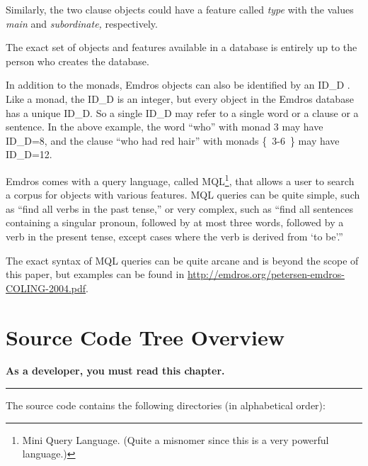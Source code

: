 \documentclass[11pt,oneside,a4paper]{memoir}
\newcommand*{\indexw}[1]{%
  #1%
  \index{#1}%
}
\begin{document}
Similarly, the two clause objects could have a feature called \emph{type} with the values
\emph{main} and \emph{subordinate,} respectively.

The exact set of objects and features available in a database is entirely up to the person who
creates the database.

In addition to the monads, Emdros objects can also be identified by an \indexw{ID\_D}. Like a monad, the ID\_D
is an integer, but every object in the Emdros database has a unique ID\_D. So a single ID\_D may refer to
a single word or a clause or a sentence. In the above example, the word ``who'' with monad 3 may
have ID\_D=8, and the clause ``who had red hair'' with monads \{~3-6~\} may have ID\_D=12.

Emdros comes with a query language, called MQL\footnote{Mini Query Language. (Quite a misnomer since
  this is a very powerful language.)}, that allows a user to search a corpus for objects with
various features. MQL queries can be quite simple, such as ``find all verbs in the past tense,'' or
very complex, such as ``find all sentences containing a singular pronoun, followed by at most three
words, followed by a verb in the present tense, except cases where the verb is derived from `to
be'.''

The exact syntax of MQL queries can be quite arcane and is beyond the scope of this paper, but
examples can be found in \url{http://emdros.org/petersen-emdros-COLING-2004.pdf}.



\chapter{Source Code Tree Overview}

\textbf{As a developer, you must read this chapter.}
\plainbreak{3}

The source code contains the following directories (in alphabetical order):
\end{document}
